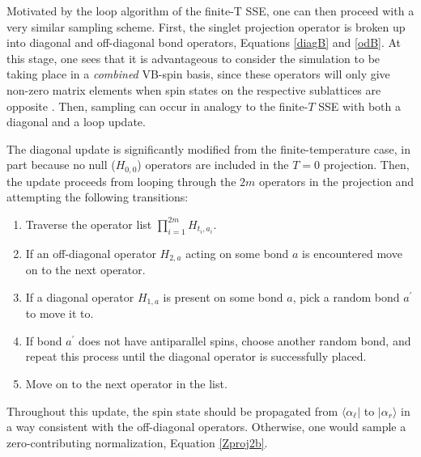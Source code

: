 \documentclass[vecphys]{svmult}
\begin{document}
Motivated by the loop algorithm of the finite-T SSE, one can then proceed with a very similar sampling scheme.  First, the singlet projection operator is broken up into diagonal and off-diagonal bond operators, Equations \ref{diagB} and \ref{odB}.
At this stage, one sees that it is advantageous to consider the simulation to be taking place in a {\em combined} VB-spin basis, since these operators will only give non-zero matrix elements when spin states on the respective sublattices are opposite \cite{Melko:Sandvik10a}.  Then, sampling can occur in analogy to the finite-$T$ SSE with both a diagonal and a loop update.

The diagonal update is significantly modified from the finite-temperature case, in part because no null ($H_{0,0}$) operators are included in the $T=0$ projection.  Then, the update proceeds from looping through the $2m$ operators in the projection and attempting the following transitions:
\begin{enumerate}
\item Traverse the operator list $\prod_{i=1}^{2m} {H_{t_i,a_i}}$.
\item If an off-diagonal operator $H_{2,a}$ acting on some bond $a$ is encountered move on to the next operator.
\item If a diagonal operator $H_{1,a}$ is present on some bond $a$, pick a random bond $a^\prime$ to move it to.
\item If bond $a^\prime$ does not have antiparallel spins, choose another random bond, and repeat this process until the diagonal operator is successfully placed.
\item Move on to the next operator in the list.
\end{enumerate}
Throughout this update, the spin state should be propagated from $\langle \alpha_{\ell} |$ to $| \alpha_r \rangle$ in a way consistent with the off-diagonal operators.  Otherwise, one would sample a zero-contributing normalization, Equation \ref{Zproj2b}.
\end{document}
